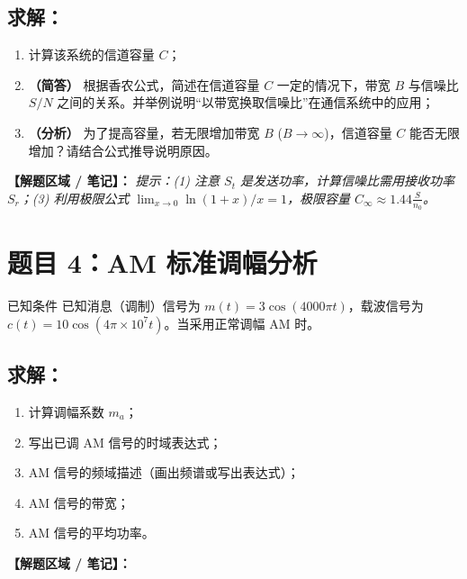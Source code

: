 \documentclass[12pt, a4paper]{article}
\begin{document}
	\subsection*{求解：}
	\begin{enumerate}[label=(\arabic*)]
		\item 计算该系统的信道容量 $C$；
		\item \textbf{（简答）} 根据香农公式，简述在信道容量 $C$ 一定的情况下，带宽 $B$ 与信噪比 $S/N$ 之间的关系。并举例说明“以带宽换取信噪比”在通信系统中的应用；
		\item \textbf{（分析）} 为了提高容量，若无限增加带宽 $B$ ($B \to \infty$)，信道容量 $C$ 能否无限增加？请结合公式推导说明原因。
	\end{enumerate}
	
	\noindent\textbf{【解题区域 / 笔记】：}
	\textit{提示：(1) 注意 $S_t$ 是发送功率，计算信噪比需用接收功率 $S_r$；(3) 利用极限公式 $\lim_{x\to0} \ln(1+x)/x = 1$，极限容量 $C_{\infty} \approx 1.44 \frac{S}{n_0}$。}
	
	\newpage
	
	\section*{题目 4：AM 标准调幅分析}
	
	\begin{problembox}{已知条件}
		已知消息（调制）信号为 $m(t) = 3\cos(4000\pi t)$，载波信号为 $c(t) = 10\cos(4\pi \times 10^7 t)$。当采用正常调幅 AM 时。
	\end{problembox}
	
	\subsection*{求解：}
	\begin{enumerate}[label=(\arabic*)]
		\item 计算调幅系数 $m_a$；
		\item 写出已调 AM 信号的时域表达式；
		\item AM 信号的频域描述（画出频谱或写出表达式）；
		\item AM 信号的带宽；
		\item AM 信号的平均功率。
	\end{enumerate}
	
	\noindent\textbf{【解题区域 / 笔记】：}
	
	\newpage
	
\end{document}
